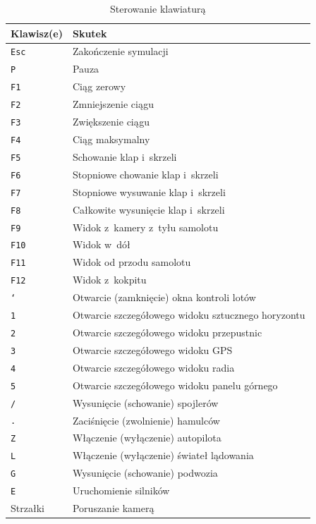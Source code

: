 \documentclass{mwrep}
\begin{document}
\begin{center}
\begin{table}[h]
\begin{center}
\caption{Sterowanie klawiaturą}\label{T:Sterowanie_klawiatura}
\vspace{3ex}
\begin{tabularx}{1\textwidth}{|l|X|}
\hline
Klawisz(e) & Skutek \\ \hline
\texttt{Esc} & Zakończenie symulacji \\
\texttt{P} & Pauza \\
\texttt{F1} & Ciąg zerowy \\
\texttt{F2} & Zmniejszenie ciągu \\
\texttt{F3} & Zwiększenie ciągu \\
\texttt{F4} & Ciąg maksymalny \\
\texttt{F5} & Schowanie klap i~skrzeli \\
\texttt{F6} & Stopniowe chowanie klap i~skrzeli \\
\texttt{F7} & Stopniowe wysuwanie klap i~skrzeli \\
\texttt{F8} & Całkowite wysunięcie klap i~skrzeli \\
\texttt{F9} & Widok z~kamery z~tyłu samolotu \\
\texttt{F10} & Widok w~dół \\
\texttt{F11} & Widok od przodu samolotu \\
\texttt{F12} & Widok z~kokpitu \\
\texttt{`} & Otwarcie (zamknięcie) okna kontroli lotów \\
\texttt{1} & Otwarcie szczegółowego widoku sztucznego horyzontu \\
\texttt{2} & Otwarcie szczegółowego widoku przepustnic \\
\texttt{3} & Otwarcie szczegółowego widoku GPS \\
\texttt{4} & Otwarcie szczegółowego widoku radia \\
\texttt{5} & Otwarcie szczegółowego widoku panelu górnego \\
\texttt{/} & Wysunięcie (schowanie) spojlerów \\
\texttt{.} & Zaciśnięcie (zwolnienie) hamulców \\
\texttt{Z} & Włączenie (wyłączenie) autopilota \\
\texttt{L} & Włączenie (wyłączenie) świateł lądowania \\
\texttt{G} & Wysunięcie (schowanie) podwozia \\
\texttt{E} & Uruchomienie silników \\
Strzałki & Poruszanie kamerą \\
\hline
\end{tabularx}
\end{center}
\end{table}
\end{center}
\end{document}
